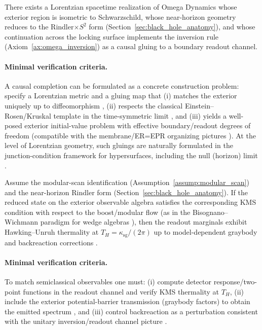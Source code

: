 \begin{conjecture}
\label{conj:causal_inversion}
There exists a Lorentzian spacetime realization of Omega Dynamics whose exterior region is isometric to Schwarzschild, whose near-horizon geometry reduces to the Rindler$\times S^2$ form (Section~\ref{sec:black_hole_anatomy}), and whose continuation across the locking surface implements the inversion rule (Axiom~\ref{ax:omega_inversion}) as a causal gluing to a boundary readout channel.\par
\end{conjecture}
\paragraph{Minimal verification criteria.}
A causal completion can be formulated as a concrete construction problem: specify a Lorentzian metric and a gluing map that (i) matches the exterior uniquely up to diffeomorphism \cite{Wald1984}, (ii) respects the classical Einstein--Rosen/Kruskal template in the time-symmetric limit \cite{EinsteinRosen1935,Kruskal1960}, and (iii) yields a well-posed exterior initial-value problem with effective boundary/readout degrees of freedom (compatible with the membrane/ER=EPR organizing pictures \cite{ThornePrice1986,SusskindMaldacena2013}). At the level of Lorentzian geometry, such gluings are naturally formulated in the junction-condition framework for hypersurfaces, including the null (horizon) limit \cite{Israel1966,BarrabesIsrael1991,Poisson2004}.

\begin{conjecture}
\label{conj:hawking_kms}
Assume the modular-scan identification (Assumption~\ref{assump:modular_scan}) and the near-horizon Rindler form (Section~\ref{sec:black_hole_anatomy}). If the reduced state on the exterior observable algebra satisfies the corresponding KMS condition with respect to the boost/modular flow (as in the Bisognano--Wichmann paradigm for wedge algebras \cite{BisognanoWichmann1975,BisognanoWichmann1976,Haag1996}), then the readout marginals exhibit Hawking--Unruh thermality at $T_H=\kappa_{\mathrm{sg}}/(2\pi)$ up to model-dependent graybody and backreaction corrections \cite{Hawking1975,HartleHawking1976,BirrellDavies1982,Wald1994,KayWald1991,Unruh1976,Wald1984,Page1976Emission}.\par
\end{conjecture}
\paragraph{Minimal verification criteria.}
To match semiclassical observables one must: (i) compute detector response/two-point functions in the readout channel and verify KMS thermality at $T_H$, (ii) include the exterior potential-barrier transmission (graybody factors) to obtain the emitted spectrum \cite{Page1976Emission}, and (iii) control backreaction as a perturbation consistent with the unitary inversion/readout channel picture \cite{Wald1994,Wald1984}.
